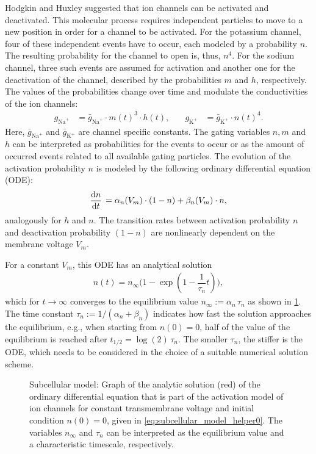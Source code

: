 Hodgkin and Huxley suggested that ion channels can be activated and deactivated. This molecular process requires independent  particles to move to a new position in order for a channel to be activated. For the potassium channel, four of these independent events have to occur, each modeled by a probability $n$. The resulting probability for the channel to open is, thus, $n^4$. For the sodium channel, three such events are assumed for activation and another one for the deactivation of the channel, described by the probabilities $m$ and $h$, respectively. The values of the probabilities change over time and modulate the conductivities of the ion channels:
%
\begin{align*}
  g_{\text{Na}^{+}} &= \bar{g}_{\text{Na}^{+}} \cdot m(t)^3 \cdot h(t), \quad &g_{\text{K}^{+}} &= \bar{g}_{\text{K}^{+}} \cdot n(t)^4.
\end{align*}
%
Here, $\bar{g}_{\text{Na}^{+}}$ and $\bar{g}_{\text{K}^{+}}$ are channel specific constants. The gating variables $n,m$ and $h$ can be interpreted as probabilities for the events to occur or as the amount of occurred events related to all available gating particles. 
The evolution of the activation probability $n$ is modeled by the following ordinary differential equation (ODE):%
\begin{align*}
  \d{n}{t} = \alpha_n(V_m) \cdot (1-n) + \beta_n(V_m) \cdot n,
\end{align*}
analogously for $h$ and $n$. The transition rates between activation probability $n$ and deactivation probability $(1-n)$ are nonlinearly dependent on the membrane voltage $V_m$.

For a constant $V_m$, this ODE has an analytical solution
\begin{align}\label{eq:subcellular_model_helper0}
  n(t) = n_\infty\big(1 - \exp(1 - \dfrac{1}{\tau_n}t)\big),
\end{align}
which for $t\to \infty$ converges to the equilibrium value $n_\infty := \alpha_n\,\tau_n$ as shown in \cref{fig:ode_solution}. The time constant $\tau_n := 1/(\alpha_n + \beta_n)$ indicates how fast the solution approaches the equilibrium, e.g., when starting from $n(0)=0$, half of the value of the equilibrium is reached after $t_{1/2}=\log(2)\,\tau_n$. The smaller $\tau_n$, the stiffer is the ODE, which needs to be considered in the choice of a suitable numerical solution scheme.

\begin{figure}%
  \centering%
  \def\svgwidth{0.4\textwidth}
  \caption{Subcellular model: Graph of the analytic solution (red) of the ordinary differential equation that is part of the activation model of ion channels for constant transmembrane voltage and initial condition $n(0)=0$, given in \cref{eq:subcellular_model_helper0}. The variables $n_\infty$ and $\tau_n$ can be interpreted as the equilibrium value and a characteristic timescale, respectively.}%
  \label{fig:ode_solution}%
\end{figure}

